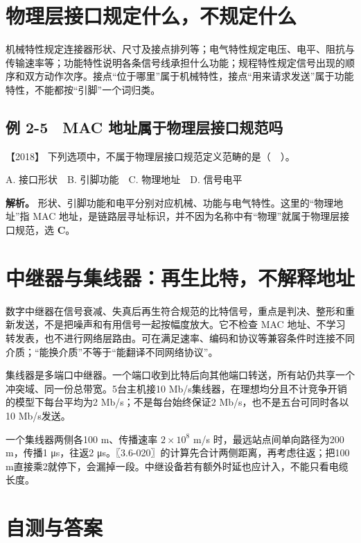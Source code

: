 \section{物理层接口规定什么，不规定什么}\label{cn-02-07}

机械特性规定连接器形状、尺寸及接点排列等；电气特性规定电压、电平、阻抗与传输速率等；功能特性说明各条信号线承担什么功能；规程特性规定信号出现的顺序和双方动作次序。接点``位于哪里''属于机械特性，接点``用来请求发送''属于功能特性，不能都按``引脚''一个词归类。

\subsection{例 2-5　MAC 地址属于物理层接口规范吗}\label{cn-ex2-5}

\noindent{}【2018】 下列选项中，不属于物理层接口规范定义范畴的是（　）。

A. 接口形状　B. 引脚功能　C. 物理地址　D. 信号电平


\textbf{解析。} 形状、引脚功能和电平分别对应机械、功能与电气特性。这里的``物理地址''指 MAC 地址，是链路层寻址标识，并不因为名称中有``物理''就属于物理层接口规范，选 \textbf{C}。

\section{中继器与集线器：再生比特，不解释地址}\label{cn-02-08}

数字中继器在信号衰减、失真后再生符合规范的比特信号，重点是判决、整形和重新发送，不是把噪声和有用信号一起按幅度放大。它不检查 MAC 地址、不学习转发表，也不进行网络层路由。可在满足速率、编码和协议等兼容条件时连接不同介质；``能换介质''不等于``能翻译不同网络协议''。

集线器是多端口中继器。一个端口收到比特后向其他端口转送，所有站仍共享一个冲突域、同一份总带宽。5台主机接10 Mb/s集线器，在理想均分且不计竞争开销的模型下每台平均为2 Mb/s；不是每台始终保证2 Mb/s，也不是五台可同时各以10 Mb/s发送。

一个集线器两侧各100 m、传播速率 \(2\times10^8\) m/s 时，最远站点间单向路径为200 m，传播1 μs，往返2 μs。〖3.6-020〗的计算先合计两侧距离，再考虑往返；把100 m直接乘2就停下，会漏掉一段。中继设备若有额外时延也应计入，不能只看电缆长度。

\section{自测与答案}\label{cn-ch2-review}

